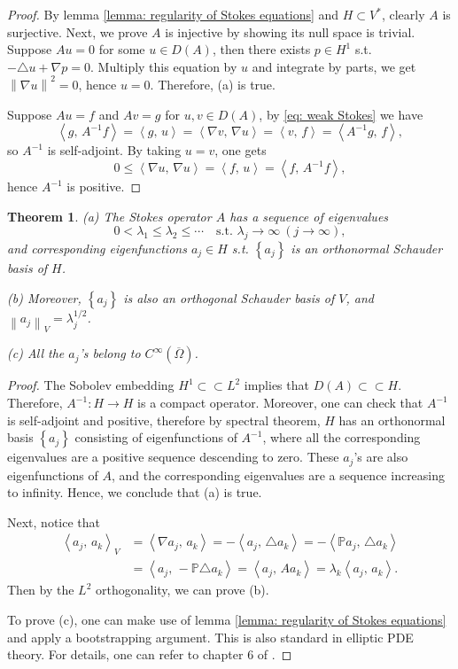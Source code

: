 \documentclass[a4paper, 12pt, oneside]{amsart}
\newtheorem{theorem}{Theorem}
\theoremstyle{definition}
\theoremstyle{remark}
\newcommand{\norm}[1]{\left\lVert #1 \right\rVert}
\newcommand{\bk}[2]{\left\langle #1,\, #2 \right\rangle}
\newcommand{\set}[1]{\left\{ #1 \right\}}
\renewcommand{\leq}{\leqslant}
\newcommand{\ol}[1]{\overline{#1}}
\newcommand{\mb}[1]{\mathbb{#1}}
\newcommand{\laplace}{\triangle}
\begin{document}
\begin{proof}
    By lemma \ref{lemma: regularity of Stokes equations} and $H\subset V^*$, clearly $A$ is surjective.
    Next, we prove $A$ is injective by showing its null space is trivial. Suppose $Au=0$ for some $u\in D(A)$, then there exists $p\in H^1$ s.t. $-\laplace u + \nabla p = 0$. Multiply this equation by $u$ and integrate by parts, we get $\norm{\nabla u}^2=0$, hence $u=0$. Therefore, (a) is true.

    Suppose $Au=f$ and $Av=g$ for $u, v\in D(A)$, by \ref{eq: weak Stokes} we have
    \[
        \bk{g}{A^{-1}f} = \bk{g}{u} = \bk{\nabla v}{\nabla u} = \bk{v}{f} = \bk{A^{-1}g}{f},
    \]
    so $A^{-1}$ is self-adjoint. By taking $u=v$, one gets
    \[
        0\leq \bk{\nabla u}{\nabla u} = \bk{f}{u} = \bk{f}{A^{-1}f},
    \]
    hence $A^{-1}$ is positive.
\end{proof}

\begin{theorem}
    (a) The Stokes operator $A$ has a sequence of eigenvalues
    \[
        0<\lambda_1\leq\lambda_2\leq\cdots\quad\text{s.t. } \lambda_j\to\infty\ (j\to\infty),
    \]
    and corresponding eigenfunctions $a_j\in H$ s.t. $\set{a_j}$ is an orthonormal Schauder basis of $H$. 
    
    (b) Moreover, $\set{a_j}$ is also an orthogonal Schauder basis of $V$, and $\norm{a_j}_V=\lambda_j^{1/2}$.

    (c) All the $a_j$'s belong to $C^\infty(\ol{\Omega})$.
\end{theorem}

\begin{proof}
    The Sobolev embedding $H^1\subset\subset L^2$ implies that $D(A)\subset\subset H$. Therefore, $A^{-1}: H\to H$ is a compact operator. Moreover, one can check that $A^{-1}$ is self-adjoint and positive, therefore by spectral theorem, $H$ has an orthonormal basis $\set{a_j}$ consisting of eigenfunctions of $A^{-1}$, where all the corresponding eigenvalues are a positive sequence descending to zero. These $a_j$'s are also eigenfunctions of $A$, and the corresponding eigenvalues are a sequence increasing to infinity. Hence, we conclude that (a) is true.

    Next, notice that
    \begin{align*}
        \bk{a_j}{a_k}_V &= \bk{\nabla a_j}{a_k} = -\bk{a_j}{\laplace a_k} = -\bk{\mb{P}a_j}{\laplace a_k} \\
        &= \bk{a_j}{-\mb{P}\laplace a_k} = \bk{a_j}{Aa_k} = \lambda_k\bk{a_j}{a_k}.
    \end{align*}
    Then by the $L^2$ orthogonality, we can prove (b).
    
    To prove (c), one can make use of lemma \ref{lemma: regularity of Stokes equations} and apply a bootstrapping argument. This is also standard in elliptic PDE theory. For details, one can refer to chapter 6 of \cite{evans2010partial}. 
\end{proof}
\end{document}
